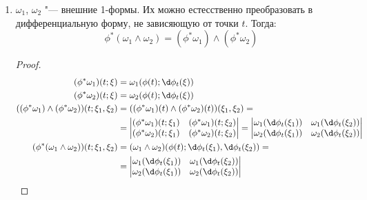 \begin{enumerate}
\item
	$\omega_1$, $\omega_2$ "--- внешние 1-формы.
	Их можно естесственно преобразовать в дифференциальную форму, не зависяющую от точки $t$.
	Тогда:
	\[ \phi^*(\omega_1 \wedge \omega_2) = (\phi^* \omega_1) \wedge (\phi^* \omega_2) \]
	\begin{proof}
		\begin{align*}
			(\phi^* \omega_1) (t; \xi) &= \omega_1(\phi(t); \d \phi_t(\xi)) \\
			(\phi^* \omega_2) (t; \xi) &= \omega_2(\phi(t); \d \phi_t(\xi)) \\
			((\phi^* \omega_1) \wedge (\phi^* \omega_2)) (t; \xi_1, \xi_2)
			&= ((\phi^* \omega_1)(t) \wedge (\phi^* \omega_2)(t)) (\xi_1, \xi_2) = \\
			&= \begin{vmatrix}
				(\phi^* \omega_1)(t; \xi_1) & (\phi^* \omega_1)(t; \xi_2) \\
				(\phi^* \omega_2)(t; \xi_1) & (\phi^* \omega_2)(t; \xi_2) \\
			\end{vmatrix}
			= \begin{vmatrix}
				\omega_1(\d \phi_t(\xi_1)) & \omega_1(\d \phi_t(\xi_2)) \\
				\omega_2(\d \phi_t(\xi_1)) & \omega_2(\d \phi_t(\xi_2)) \\
			\end{vmatrix} \\
			(\phi^* (\omega_1 \wedge \omega_2)) (t; \xi_1, \xi_2)
			&= (\omega_1 \wedge \omega_2)(\phi(t); \d \phi_t(\xi_1), \d \phi_t(\xi_2)) = \\
			&= \begin{vmatrix}
				\omega_1(\d \phi_t(\xi_1)) & \omega_1(\d \phi_t(\xi_2)) \\
				\omega_2(\d \phi_t(\xi_1)) & \omega_2(\d \phi_t(\xi_2)) \\
			\end{vmatrix}
		\end{align*}
	\end{proof}
\end{enumerate}

